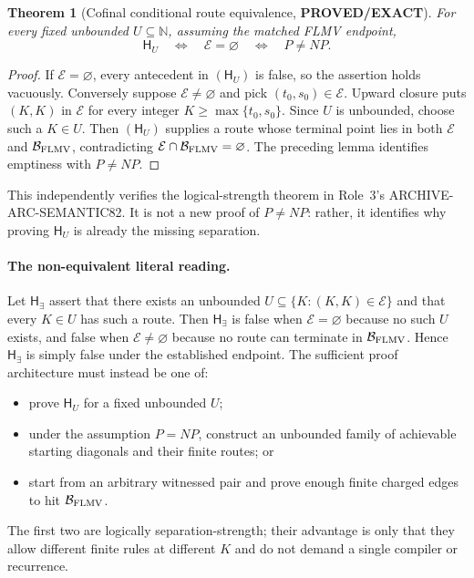 \documentclass[11pt]{article}
\newtheorem{theorem}{Theorem}
\newcommand{\EE}{\mathcal E}
\newcommand{\BB}{\mathcal B_{\rm FLMV}}
\newcommand{\EXACT}{\textbf{PROVED/EXACT}}
\begin{document}
\begin{theorem}[Cofinal conditional route equivalence, \EXACT]
For every fixed unbounded $U\subseteq\mathbb N$, assuming the matched FLMV
endpoint,
\[
 \mathsf H_U\quad\Longleftrightarrow\quad\EE=\varnothing
 \quad\Longleftrightarrow\quad P\ne NP.
\]
\end{theorem}
\begin{proof}
If $\EE=\varnothing$, every antecedent in $(\mathsf H_U)$ is false, so the
assertion holds vacuously.  Conversely suppose $\EE\ne\varnothing$ and pick
$(t_0,s_0)\in\EE$.  Upward closure puts $(K,K)$ in $\EE$ for every integer
$K\ge\max\{t_0,s_0\}$.  Since $U$ is unbounded, choose such a $K\in U$.
Then $(\mathsf H_U)$ supplies a route whose terminal point lies in both
$\EE$ and $\BB$, contradicting $\EE\cap\BB=\varnothing$.
The preceding lemma identifies emptiness with $P\ne NP$.
\end{proof}

This independently verifies the logical-strength theorem in Role~3's
ARCHIVE-ARC-SEMANTIC82.  It is not a new proof of $P\ne NP$: rather, it
identifies why proving $\mathsf H_U$ is already the missing separation.

\paragraph{The non-equivalent literal reading.}
Let $\mathsf H_{\exists}$ assert that there exists an unbounded
$U\subseteq\{K:(K,K)\in\EE\}$ and that every $K\in U$ has such a route.
Then $\mathsf H_{\exists}$ is false when $\EE=\varnothing$ because no such
$U$ exists, and false when $\EE\ne\varnothing$ because no route can terminate
in $\BB$.  Hence $\mathsf H_{\exists}$ is simply false under the established
endpoint.  The sufficient proof architecture must instead be one of:
\begin{itemize}
\item prove $\mathsf H_U$ for a fixed unbounded $U$;
\item under the assumption $P=NP$, construct an unbounded family of
achievable starting diagonals and their finite routes; or
\item start from an arbitrary witnessed pair and prove enough finite charged
edges to hit $\BB$.
\end{itemize}
The first two are logically separation-strength; their advantage is only that
they allow different finite rules at different $K$ and do not demand a single
compiler or recurrence.
\end{document}
